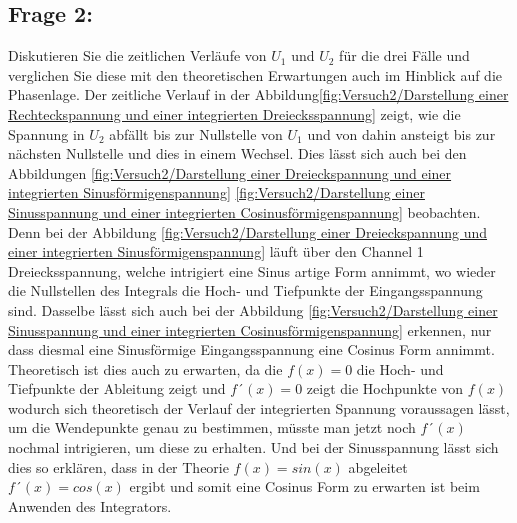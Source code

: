 \subsection{Frage 2:} Diskutieren Sie die zeitlichen Verläufe von $U_1$ und $U_2$ für die drei Fälle und verglichen Sie diese mit den theoretischen Erwartungen auch im Hinblick auf die Phasenlage.
Der zeitliche Verlauf in der Abbildung\ref{fig:Versuch2/Darstellung einer Rechteckspannung und einer integrierten Dreiecksspannung} zeigt, wie die Spannung in $U_2$ abfällt bis zur Nullstelle von $U_1$ und  von dahin ansteigt bis zur nächsten Nullstelle und dies in einem Wechsel. Dies lässt sich auch bei den Abbildungen \ref{fig:Versuch2/Darstellung einer Dreieckspannung und einer integrierten Sinusförmigenspannung} \ref{fig:Versuch2/Darstellung einer Sinusspannung und einer integrierten Cosinusförmigenspannung} beobachten. Denn bei der Abbildung \ref{fig:Versuch2/Darstellung einer Dreieckspannung und einer integrierten Sinusförmigenspannung} läuft über den Channel 1 Dreiecksspannung, welche intrigiert eine Sinus artige Form annimmt, wo wieder die Nullstellen des Integrals die Hoch- und Tiefpunkte der Eingangsspannung sind. Dasselbe lässt sich auch bei der Abbildung \ref{fig:Versuch2/Darstellung einer Sinusspannung und einer integrierten Cosinusförmigenspannung} erkennen, nur dass diesmal eine Sinusförmige Eingangsspannung eine Cosinus Form annimmt. Theoretisch ist dies auch zu erwarten, da die $f(x)=0$ die Hoch- und Tiefpunkte der Ableitung zeigt und $f´(x)=0$ zeigt die Hochpunkte von $f(x)$ wodurch sich theoretisch der Verlauf der integrierten Spannung voraussagen lässt, um die Wendepunkte genau zu bestimmen, müsste man jetzt noch $f´(x)$ nochmal intrigieren, um diese zu erhalten. Und bei der Sinusspannung lässt sich dies so erklären, dass in der Theorie $f(x)=sin(x)$ abgeleitet $f´(x)=cos(x)$ ergibt und somit eine Cosinus Form zu erwarten ist beim Anwenden des Integrators.  





